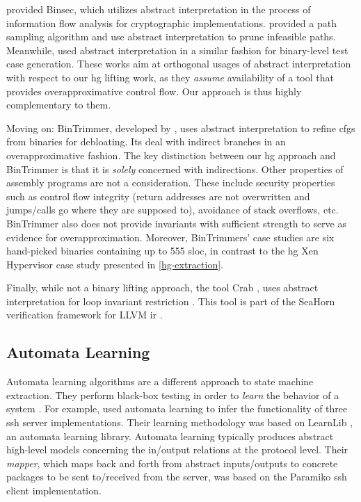 \Textcite{bardin2011bincoa,daniel2020binsec} provided Binsec, which utilizes abstract interpretation in the process of information flow analysis for cryptographic implementations.
\Textcite{zhang2019bda} provided a path sampling algorithm and use abstract interpretation to prune infeasible paths.
Meanwhile, \textcite{reinbacher2011test} used abstract interpretation in a similar fashion for binary-level test case generation.
These works aim at orthogonal usages of abstract interpretation with respect to our \ac{hg} lifting work, as they \emph{assume} availability of a tool that provides overapproximative control flow.
Our approach is thus highly complementary to them.

Moving on: BinTrimmer, developed by \textcite{redini2019b}, uses abstract interpretation to refine \acp{cfg} from binaries for debloating.
Its deal with indirect branches in an overapproximative fashion.
The key distinction between our \ac{hg} approach and BinTrimmer is that it is \emph{solely} concerned with indirections.
Other properties of assembly programs are not a consideration.
These include security properties such as control flow integrity (return addresses are not overwritten and jumps/calls go where they are supposed to), avoidance of stack overflows, etc.
BinTrimmer also does not provide invariants with sufficient strength to serve as evidence for overapproximation.
Moreover, BinTrimmers' case studies are six hand-picked binaries containing up to \num{555} \ac{sloc}, in contrast to the \ac{hg} Xen Hypervisor case study presented in \cref{hg-extraction}.

Finally, while not a binary lifting approach, the tool Crab \autocite{crab}, uses abstract interpretation for loop invariant restriction \autocite{gange2016abstract}.
This tool is part of the SeaHorn verification framework for LLVM \ac{ir} \autocite{seahorn}.

\subsection{Automata Learning}\label{related-automata}
Automata learning algorithms are a different approach to state machine extraction.
They perform black-box testing in order to \emph{learn} the behavior of a system \autocite{steffen2011active}.
For example, \textcite{fiter2017ssh} used automata learning to infer the functionality of three \ac{ssh} server implementations.
Their learning methodology was based on LearnLib \autocite{raffelt2005learnlib}, an automata learning library.
Automata learning typically produces abstract high-level models concerning the in/output relations at the protocol level.
Their \emph{mapper}, which maps back and forth from abstract inputs/outputs to concrete packages to be sent to/received from the server,
was based on the Paramiko
\ac{ssh} client implementation.

